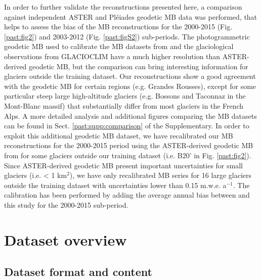 {In order to further validate the reconstructions presented here, a comparison against independent ASTER \citep{davaze_region-wide_2020} and Pléiades \citep{berthier_glacier_2014} geodetic MB data was performed, that helps to assess the bias of the MB reconstructions for the 2000-2015 (Fig. \ref{past:fig2}) and 2003-2012 (Fig. \ref{past:figS2}) sub-periods.  The photogrammetric geodetic MB used to calibrate the MB datasets from \citet{rabatel_spatio-temporal_2016} and the glaciological observations from GLACIOCLIM have a much higher resolution than ASTER-derived geodetic MB, but the comparison can bring interesting information for glaciers outside the training dataset. Our reconstructions show a good agreement with the geodetic MB for certain regions (e.g. Grandes Rousses), except for some particular steep large high-altitude glaciers (e.g. Bossons and Taconnaz in the Mont-Blanc massif) that substantially differ from most glaciers in the French Alps. A more detailed analysis and additional figures comparing the MB datasets can be found in Sect. \ref{past:supp:comparison} of the Supplementary. In order to exploit this additional geodetic MB dataset, we have recalibrated our MB reconstructions for the 2000-2015 period using the ASTER-derived geodetic MB from \citet{davaze_region-wide_2020} for some glaciers outside our training dataset (i.e. B20' in Fig. \ref{past:fig2}). Since ASTER-derived geodetic MB present important uncertainties for small glaciers (i.e. < 1 km$^{2}$), we have only recalibrated MB series for 16 large glaciers outside the training dataset with uncertainties lower than 0.15 m.w.e. a$^{-1}$. The calibration has been performed by adding the average annual bias between \citet{davaze_region-wide_2020} and this study for the 2000-2015 sub-period.


\section{Dataset overview} \label{past:overview}

\subsection{Dataset format and content} \label{past:overview:format}

}
